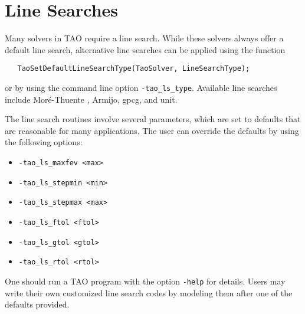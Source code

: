 \section{Line Searches} 
\label{sec:TaoLineSearch}

Many solvers in TAO require a line search.  While these solvers always
offer a default line search, alternative line searches can be applied
using the function
\begin{verbatim}
   TaoSetDefaultLineSearchType(TaoSolver, LineSearchType);
\end{verbatim}
or by using the command line option  {\tt -tao\_ls\_type}.  
Available line searches 
include Mor\'{e}-Thuente \cite{more:92}, Armijo, gpcg, and unit.

The line search routines involve several parameters, which are set
to defaults that are reasonable for many applications.  The user
can override the defaults by using the following options:
\begin{itemize}
\item {\tt -tao\_ls\_maxfev <max>}
\item {\tt -tao\_ls\_stepmin <min>}
\item {\tt -tao\_ls\_stepmax <max>}
\item {\tt -tao\_ls\_ftol <ftol>}
\item {\tt -tao\_ls\_gtol <gtol>}
\item {\tt -tao\_ls\_rtol <rtol>}
\end{itemize}

One should run a TAO program with the option 
{\tt -help}
for details.  Users may write their own customized line search codes
by modeling them after one of the defaults provided.

